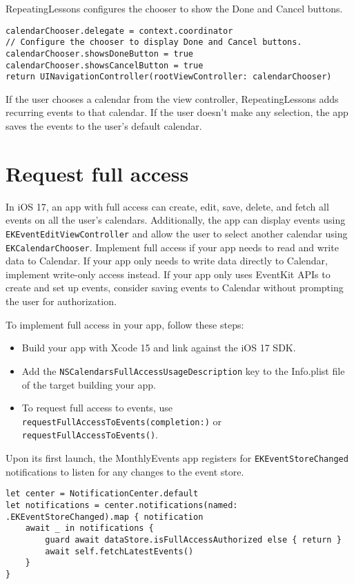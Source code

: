 \documentclass{article}
\begin{document}
RepeatingLessons configures the chooser to show the Done and Cancel buttons.

\begin{verbatim}
calendarChooser.delegate = context.coordinator
// Configure the chooser to display Done and Cancel buttons.
calendarChooser.showsDoneButton = true
calendarChooser.showsCancelButton = true
return UINavigationController(rootViewController: calendarChooser)
\end{verbatim}

If the user chooses a calendar from the view controller, RepeatingLessons adds recurring events to that calendar. If the user doesn't make any selection, the app saves the events to the user's default calendar.

\section*{Request full access}

In iOS 17, an app with full access can create, edit, save, delete, and fetch all events on all the user's calendars. Additionally, the app can display events using \texttt{EKEventEditViewController} and allow the user to select another calendar using \texttt{EKCalendarChooser}. Implement full access if your app needs to read and write data to Calendar. If your app only needs to write data directly to Calendar, implement write-only access instead. If your app only uses EventKit APIs to create and set up events, consider saving events to Calendar without prompting the user for authorization.

To implement full access in your app, follow these steps:

\begin{itemize}
    \item Build your app with Xcode 15 and link against the iOS 17 SDK.
    \item Add the \texttt{NSCalendarsFullAccessUsageDescription} key to the Info.plist file of the target building your app.
    \item To request full access to events, use \texttt{requestFullAccessToEvents(completion:)} or \texttt{requestFullAccessToEvents()}.
\end{itemize}

Upon its first launch, the MonthlyEvents app registers for \texttt{EKEventStoreChanged} notifications to listen for any changes to the event store.

\begin{verbatim}
let center = NotificationCenter.default
let notifications = center.notifications(named: .EKEventStoreChanged).map { notification
    await _ in notifications {
        guard await dataStore.isFullAccessAuthorized else { return }
        await self.fetchLatestEvents()
    }
}
\end{verbatim}
\end{document}
